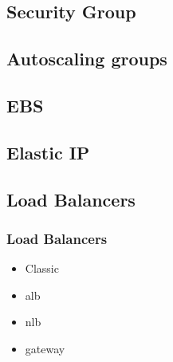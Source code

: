 \subsection{Security Group}

\subsection{Autoscaling groups}
\subsection{EBS}

\subsection{Elastic IP}

\subsection{Load Balancers}

\begin{frame}
	\frametitle{Load Balancers}
	\begin{itemize}
		\item Classic
		\item alb
		\item nlb
		\item gateway
	\end{itemize}
\end{frame}


